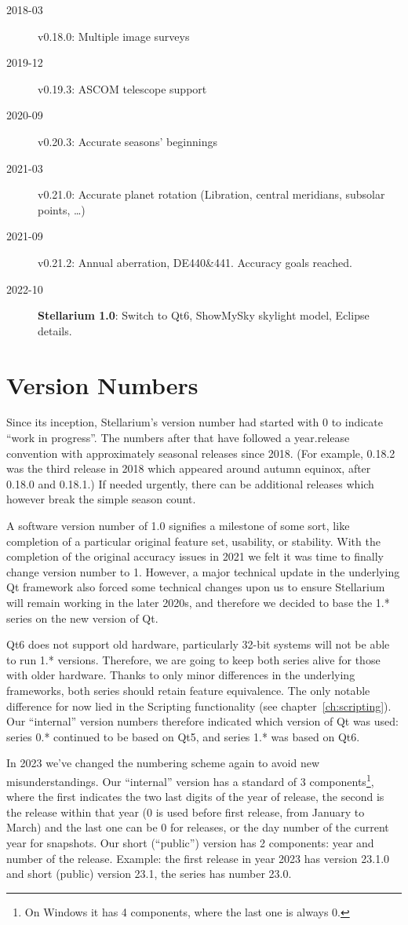 \begin{description}
\item[2018-03] v0.18.0: Multiple image surveys
\item[2019-12] v0.19.3: ASCOM telescope support 
\item[2020-09] v0.20.3: Accurate seasons' beginnings
\item[2021-03] v0.21.0: Accurate planet rotation (Libration, central meridians, subsolar points, \ldots) 
\item[2021-09] v0.21.2: Annual aberration, DE440\&441. Accuracy goals reached.
\item[2022-10] \textbf{Stellarium 1.0}: Switch to Qt6, ShowMySky skylight model, Eclipse details. 
\end{description}

\section{Version Numbers}
Since its inception, Stellarium's version number had started with 0 to
indicate ``work in progress''. The numbers after that have followed a
year.release convention with approximately seasonal releases since
2018. (For example, 0.18.2 was the third release in 2018 which
appeared around autumn equinox, after 0.18.0 and 0.18.1.) 
If needed urgently, there can be additional releases which however break the simple season count.

A software version number of 1.0 signifies a milestone of some sort,
like completion of a particular original feature set, usability, or
stability. With the completion of the original accuracy issues in 2021
we felt it was time to finally change version number to 1. However, a
major technical update in the underlying Qt framework also forced some
technical changes upon us to ensure Stellarium will remain working in
the later 2020s, and therefore we decided to base the 1.* series on
the new version of Qt.

Qt6 does not support old hardware, particularly 32-bit systems will
not be able to run 1.* versions.  Therefore, we are going to keep both
series alive for those with older hardware. Thanks to only minor
differences in the underlying frameworks, both series should retain
feature equivalence. The only notable difference for now lied in the
Scripting functionality (see chapter~\ref{ch:scripting}).
Our ``internal'' version numbers therefore indicated which version of Qt was used:
series 0.* continued to be based on Qt5, and series 1.* was based on Qt6.

In 2023 we've changed the numbering scheme again to avoid new misunderstandings. 
Our ``internal'' version has a standard of 3 components\footnote{On Windows 
it has 4 components, where the last one is always 0.}, where the first indicates 
the two last digits of the year of release, the second is the release within 
that year (0 is used before first release, from January to March) and the last 
one can be 0 for releases, or the day number of the current year for snapshots. 
Our short (``public'') version has 2 components: year 
and number of the release. Example: the first release in year 2023 has 
version 23.1.0 and short (public) version 23.1, the series has number 23.0.

